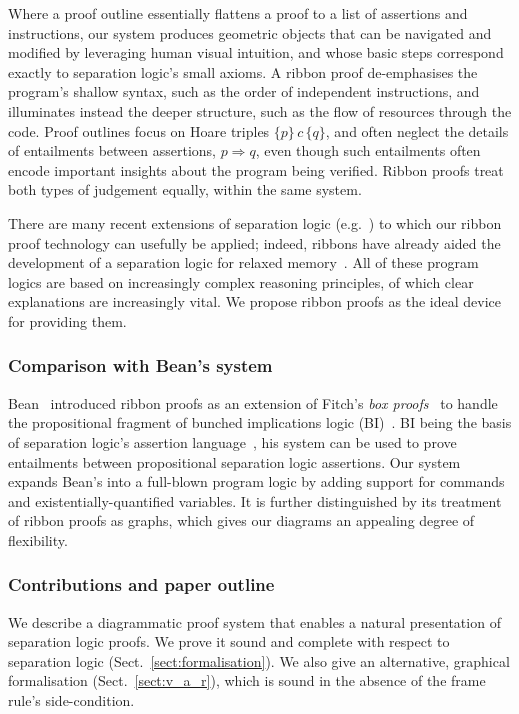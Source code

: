 \documentclass[runningheads,a4paper]{llncs}
\begin{document}
Where a proof outline essentially flattens a proof to a list of assertions and instructions, our system produces geometric objects that can be navigated and modified by leveraging human visual intuition, and whose basic steps correspond exactly to separation logic's small axioms. A ribbon proof de-emphasises the program's shallow syntax, such as the order of independent instructions, and illuminates instead the deeper structure, such as the flow of resources through the code. Proof outlines focus on Hoare triples $\{p\}\,c\,\{q\}$, and often neglect the details of entailments between assertions, $p⇒q$, even though such entailments often encode important insights about the program being verified. Ribbon proofs treat both types of judgement equally, within the same system.

There are many recent extensions of separation logic (e.g.~\cite{dinsdale-young+13,dinsdale-young+10-b,dodds+09,feng09,feng+07-a,gotsman+07,hur+11,jacobs+11,ohearn07,vafeiadis+07%
}) to which our ribbon proof technology can usefully be applied; indeed, ribbons have already aided the development of a separation logic for relaxed memory~\cite{bornat+12}. All of these program logics are based on increasingly complex reasoning principles, of which clear explanations are increasingly vital. We propose ribbon proofs as the ideal device for providing them.

\subsubsection{Comparison with Bean's system} Bean~\cite{bean06} introduced ribbon proofs as an extension of Fitch's \emph{box proofs}~\cite{fitch52} to handle the propositional fragment of bunched implications logic (BI)~\cite{ohearn+99}. BI being the basis of separation logic's assertion language~\cite{ishtiaq+01}, his system can be used to prove entailments between propositional separation logic assertions. Our system expands Bean's into a full-blown program logic by adding support for commands and existentially-quantified variables. It is further distinguished by its treatment of ribbon proofs as graphs, which gives our diagrams an appealing degree of flexibility.

\subsubsection*{Contributions and paper outline} We describe a diagrammatic proof system that enables a natural presentation of separation logic proofs. We prove it sound and complete with respect to separation logic (Sect.~\ref{sect:formalisation}). We also give an alternative, graphical formalisation (Sect.~\ref{sect:v_a_r}), which is sound in the absence of the frame rule's side-condition.
\end{document}

